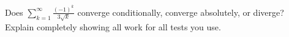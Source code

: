 \documentclass{exam}[12pt]
\begin{document}
{\begin{questions}
{

\question[10] Does $\displaystyle  \sum_{k=1}^\infty \frac{(-1)^k }{3\sqrt{k}}$ converge
conditionally, converge absolutely, or diverge?  Explain completely showing all work for all
tests you use.

\vspace{3.5in}



%

}
\end{questions}}
\end{document}
